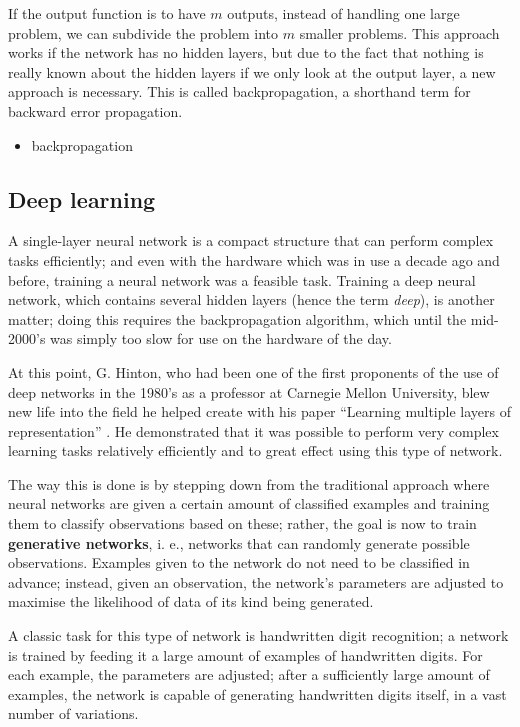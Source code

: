 If the output function is to have $m$ outputs, instead of handling one
large problem, we can subdivide the problem into $m$ smaller
problems. This approach works if the network has no hidden layers, but
due to the fact that nothing is really known about the hidden layers
if we only look at the output layer, a new approach is necessary. This
is called backpropagation, a shorthand term for backward error
propagation.
\begin{itemize}
\item backpropagation
\end{itemize}

\subsection{Deep learning}
\label{sec:deeplearning}

A single-layer neural network is a compact structure that can perform
complex tasks efficiently; and even with the hardware which was in use
a decade ago and before, training a neural network was a feasible
task. Training a deep neural network, which contains several hidden
layers (hence the term \textit{deep}), is another matter; doing this
requires the backpropagation algorithm, which until the mid-2000's was
simply too slow for use on the hardware of the day.

At this point, G. Hinton, who had been one of the first proponents of
the use of deep networks in the 1980's as a professor at Carnegie
Mellon University, blew new life into the field he helped create with
his paper ``Learning multiple layers of representation''
\citep{hinton2007learning}. He demonstrated that it was possible to
perform very complex learning tasks relatively efficiently and to
great effect using this type of network.

The way this is done is by stepping down from the traditional approach
where neural networks are given a certain amount of classified
examples and training them to classify observations based on these;
rather, the goal is now to train \textbf{generative networks}, i. e.,
networks that can randomly generate possible observations. Examples
given to the network do not need to be classified in advance; instead,
given an observation, the network's parameters are adjusted to
maximise the likelihood of data of its kind being
generated. 

A classic task for this type of network is handwritten digit
recognition; a network is trained by feeding it a large amount of
examples of handwritten digits. For each example, the parameters are
adjusted; after a sufficiently large amount of examples, the network
is capable of generating handwritten digits itself, in a vast number
of variations.


